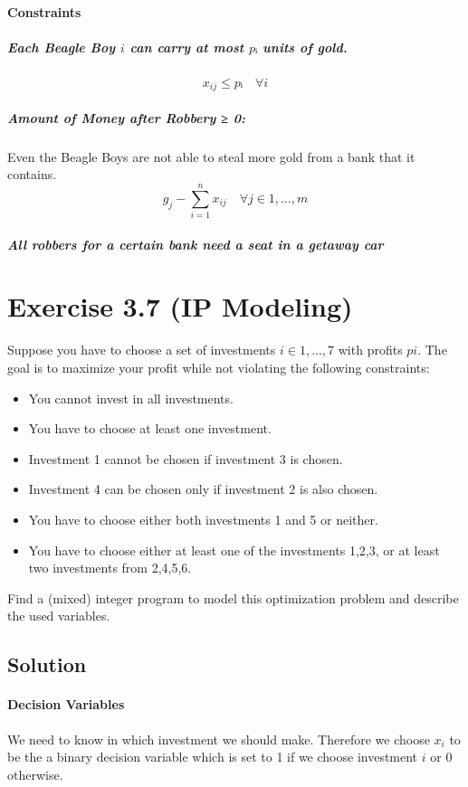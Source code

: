 \documentclass[a4paper, 12pt]{report}
\begin{document}
\paragraph{Constraints}

\subparagraph{Each Beagle Boy $i$ can carry at most $pᵢ$ units of gold.}
\[
    x_{ij} ≤ pᵢ \quad ∀i
\]

\subparagraph{Amount of Money after Robbery ≥ 0:} Even the Beagle Boys are not
able to steal more gold from a bank that it contains.
\[
    g_j - ∑_{i=1}^{n} x_{ij} \quad ∀j ∈ {1,…,m}
\]

\subparagraph{All robbers for a certain bank need a seat in a getaway car}

\section{Exercise 3.7 (IP Modeling)}

Suppose you have to choose a set of investments $i ∈ {1, ..., 7}$ with profits
$pi$. The goal is to maximize your profit while not violating the following
constraints:

\begin{itemize}
    \item You cannot invest in all investments.
    \item You have to choose at least one investment.
    \item Investment 1 cannot be chosen if investment 3 is chosen.
    \item Investment 4 can be chosen only if investment 2 is also chosen.
    \item You have to choose either both investments 1 and 5 or neither.
    \item You have to choose either at least one of the investments 1,2,3, or
          at least two investments from 2,4,5,6.
\end{itemize}

Find a (mixed) integer program to model this optimization problem and describe
the used variables.

\subsection{Solution}

\paragraph{Decision Variables}

We need to know in which investment we should make. Therefore we choose $x_i$
to be the a binary decision variable which is set to 1 if we choose investment
$i$ or 0 otherwise.
\end{document}
